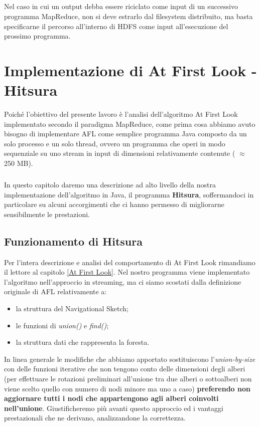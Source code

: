 \documentclass[a4paper,11pt]{report}
\begin{document}
\paragraph{}
Nel caso in cui un output debba essere riciclato come input di un successivo programma MapReduce, non si deve estrarlo dal filesystem
distribuito, ma basta specificarne il 
percorso all'interno di HDFS come input all'esecuzione del prossimo programma.




\chapter{Implementazione di At First Look - Hitsura}\label{Implementazione di At First Look - Hitsura}
Poiché l'obiettivo del presente lavoro è l'analisi dell'algoritmo At First Look implementato secondo il paradigma MapReduce, come prima cosa
abbiamo avuto bisogno 
di implementare AFL come semplice programma Java composto da un solo processo e un solo thread, ovvero un programma che operi in modo
sequenziale su uno stream in 
input di dimensioni relativamente contenute ( $\approx$ 250 MB). 
\paragraph{}
In questo capitolo daremo una descrizione ad alto livello della nostra implementazione dell'algoritmo in Java, il programma
\textbf{Hitsura}, soffermandoci in particolare su
 alcuni accorgimenti che ci hanno permesso
di migliorarne sensibilmente le prestazioni.
\section{Funzionamento di Hitsura}\label{Funzionamento del programma}
Per l'intera descrizione e analisi del comportamento di At First Look rimandiamo il lettore al capitolo \ref{At First Look}. Nel nostro
programma viene implementato l'algoritmo
nell'approccio in streaming, ma ci siamo scostati dalla definizione originale di AFL relativamente a:
\begin{itemize}
 \item la struttura del Navigational Sketch;
 \item le funzioni di \emph{union()} e \emph{find()};
 \item la struttura dati che rappresenta la foresta.
\end{itemize}
In linea generale le modifiche che abbiamo apportato sostituiscono l'\emph{union-by-size} con delle funzioni iterative che non tengono conto
delle dimensioni degli alberi
(per effettuare le rotazioni preliminari all'unione tra due alberi o sottoalberi non viene scelto quello con numero di nodi minore ma uno a
caso) \textbf{preferendo non
aggiornare tutti i nodi che appartengono agli alberi coinvolti nell'unione}.
Giustificheremo più avanti questo approccio ed i vantaggi prestazionali che ne derivano, analizzandone la correttezza. 
\end{document}
